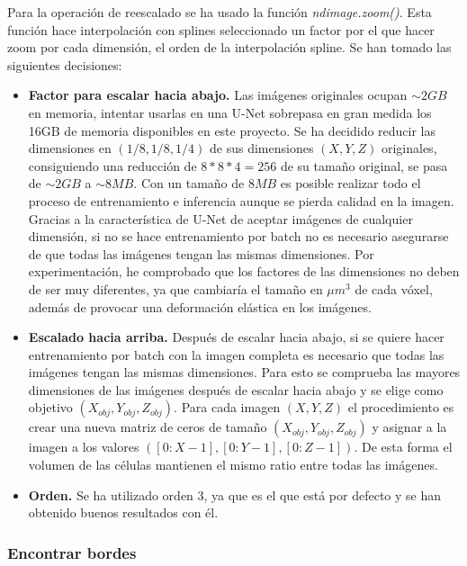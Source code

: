 Para la operación de reescalado se ha usado la función \textit{ndimage.zoom()}. Esta función hace interpolación con splines seleccionado un factor por el que hacer zoom por cada dimensión, el orden de la interpolación spline. Se han tomado las siguientes decisiones:
\begin{itemize}
\item \textbf{Factor para escalar hacia abajo.} Las imágenes originales ocupan $\sim 2GB$ en memoria, intentar usarlas en una U-Net sobrepasa en gran medida los 16GB de memoria disponibles en este proyecto. Se ha decidido reducir las dimensiones en $(1/8, 1/8, 1/4)$ de sus dimensiones $(X, Y, Z)$ originales, consiguiendo una reducción de $8*8*4=256$ de su tamaño original, se pasa de $\sim 2GB$ a $\sim 8MB$. Con un tamaño de $8MB$ es posible realizar todo el proceso de entrenamiento e inferencia aunque se pierda calidad en la imagen. Gracias a la característica de U-Net de aceptar imágenes de cualquier dimensión, si no se hace entrenamiento por batch no es necesario asegurarse de que todas las imágenes tengan las mismas dimensiones. Por experimentación, he comprobado que los factores de las dimensiones no deben de ser muy diferentes, ya que cambiaría el tamaño en $\mu m^3$ de cada vóxel, además de provocar una deformación elástica en los imágenes.
\item \textbf{Escalado hacia arriba.} Después de escalar hacia abajo, si se quiere hacer entrenamiento por batch con la imagen completa es necesario que todas las imágenes tengan las mismas dimensiones. Para esto se comprueba las mayores dimensiones de las imágenes después de escalar hacia abajo y se elige como objetivo $(X_{obj}, Y_{obj}, Z_{obj})$. Para cada imagen $(X, Y, Z)$ el procedimiento es crear una nueva matriz de ceros de tamaño $(X_{obj}, Y_{obj}, Z_{obj})$ y asignar a la imagen a los valores $([0:X-1],[0:Y-1],[0:Z-1])$. De esta forma el volumen de las células mantienen el mismo ratio entre todas las imágenes.
\item \textbf{Orden.} Se ha utilizado orden 3, ya que es el que está por defecto y se han obtenido buenos resultados con él.
\end{itemize}

\subsubsection{Encontrar bordes}

